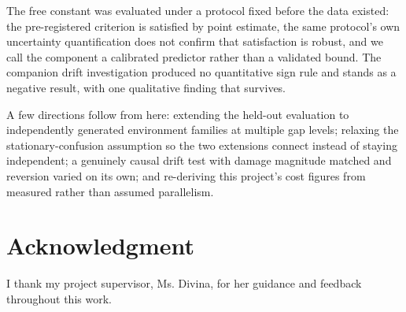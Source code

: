 \documentclass[conference]{IEEEtran}
\begin{document}
The free constant was evaluated under a protocol fixed before the data
existed: the pre-registered criterion is satisfied by point estimate, the
same protocol's own uncertainty quantification does not confirm that
satisfaction is robust, and we call the component a calibrated predictor
rather than a validated bound. The companion drift investigation produced
no quantitative sign rule and stands as a negative result, with one
qualitative finding that survives.

A few directions follow from here: extending the held-out evaluation to
independently generated environment families at multiple gap levels;
relaxing the stationary-confusion assumption so the two extensions
connect instead of staying independent; a genuinely causal drift test
with damage magnitude matched and reversion varied on its own; and
re-deriving this project's cost figures from measured rather than assumed
parallelism.

\section*{Acknowledgment}

I thank my project supervisor, Ms. Divina, for her guidance and feedback
throughout this work.
\end{document}

